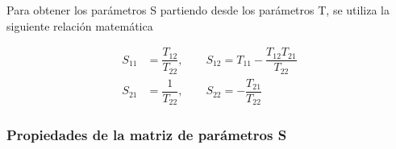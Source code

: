 Para obtener los parámetros S partiendo desde los parámetros T, se utiliza la siguiente relación matemática

\begin{equation}
	\begin{aligned}
		S_{11} &= \dfrac{T_{12}}{T_{22}},\qquad S_{12} = T_{11} - \dfrac{T_{12}T_{21}}{T_{22}} \\
		S_{21} &= \dfrac{1}{T_{22}},\qquad S_{22} = - \dfrac{T_{21}}{T_{22}}
	\end{aligned}
	\label{eq:t2s}
\end{equation}


\subsubsection{Propiedades de la matriz de parámetros S}


